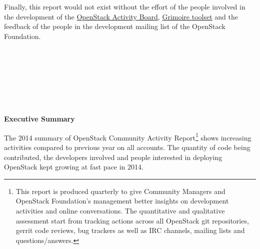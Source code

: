 \documentclass[a4wide,11pt]{report}
\begin{document}
\begin{tabular}{p{5cm}p{10cm}}

\end{tabular}

~~\\
~~\\

Finally, this report would not exist without the effort of the people involved in the development of the \href{https://activity.openstack.org/dash}{OpenStack Activity Board}, \href{http://metricsgrimoire.github.io}{Grimoire toolset} and the feedback of the people in the development mailing list of the OpenStack Foundation.

~~\\
~~\\
~~\\
~~\\
~~\\
~~\\







\newpage

\begin{center}
\textbf{Executive Summary}
\end{center}

The 2014 summary of OpenStack Community Activity Report\footnote{This report is produced quarterly to give Community Managers and OpenStack Foundation's management better insights on development activities and online conversations. The quantitative and qualitative assessment start from tracking actions across all OpenStack git repositories, gerrit code reviews, bug trackers as well as IRC channels, mailing lists and questions/answers.}  shows increasing activities compared to previous year on all accounts. The quantity of code being contributed, the developers involved and people interested in deploying OpenStack kept growing at fast pace in 2014.
\end{document}
